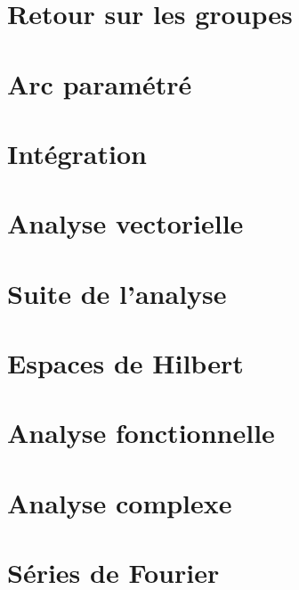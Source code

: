 \chapter{Retour sur les groupes}




\chapter{Arc paramétré}


\chapter{Intégration}








\chapter{Analyse vectorielle}


\chapter{Suite de l'analyse}







\chapter{Espaces de Hilbert}


\chapter{Analyse fonctionnelle}



\chapter{Analyse complexe}          \label{ChapICHIooXbLccl}




\chapter{Séries de Fourier}



